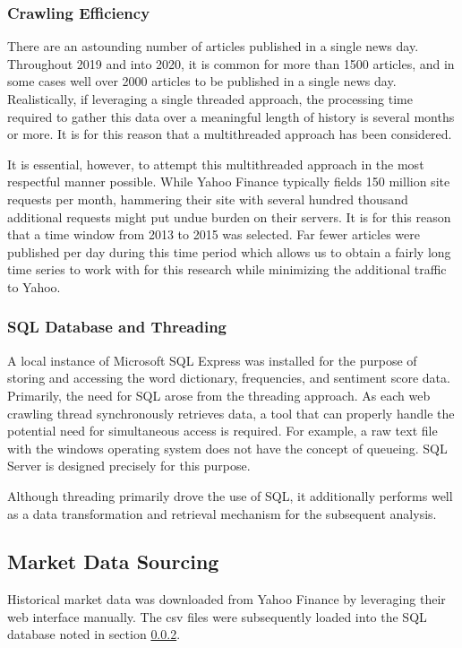 \documentclass{article}
\begin{document}
\subsubsection{Crawling Efficiency}
There are an astounding number of articles published in a single news day.  Throughout 2019 and into 2020, it is common for more than 1500 articles, and in some cases well over 2000 articles to be published in a single news day.  Realistically, if leveraging a single threaded approach, the processing time required to gather this data over a meaningful length of history is several months or more.  It is for this reason that a multithreaded approach has been considered.  

It is essential, however, to attempt this multithreaded approach in the most respectful manner possible.  While Yahoo Finance typically fields 150 million site requests per month, hammering their site with several hundred thousand additional requests might put undue burden on their servers.  It is for this reason that a time window from 2013 to 2015 was selected.  Far fewer articles were published per day during this time period which allows us to obtain a fairly long time series to work with for this research while minimizing the additional traffic to Yahoo.
\subsubsection{SQL Database and Threading}
\label{SQL}
A local instance of Microsoft SQL Express was installed for the purpose of storing and accessing the word dictionary, frequencies, and sentiment score data.  Primarily, the need for SQL arose from the threading approach.  As each web crawling thread synchronously retrieves data, a tool that can properly handle the potential need for simultaneous access is required.  For example, a raw text file with the windows operating system does not have the concept of queueing.  SQL Server is designed precisely for this purpose.  

Although threading primarily drove the use of SQL, it additionally performs well as a data transformation and retrieval mechanism for the subsequent analysis.

\subsection{Market Data Sourcing}
Historical market data was downloaded from Yahoo Finance by leveraging their web interface manually.  The csv files were subsequently loaded into the SQL database noted in section \ref{SQL}.
\end{document}
